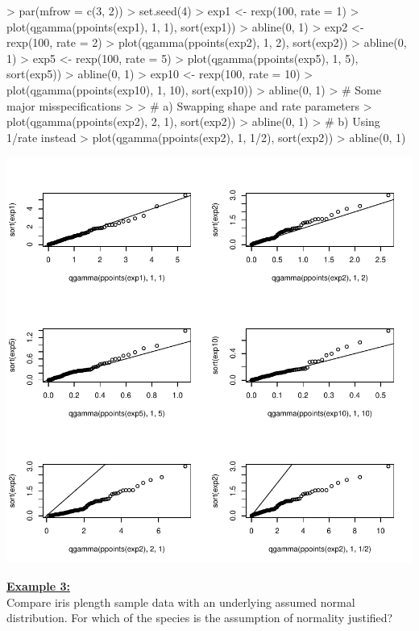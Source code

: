 \documentclass[12pt,letterpaper,final]{article}
\begin{document}
\begin{Schunk}
\begin{Sinput}
> par(mfrow = c(3, 2))
> set.seed(4) 
> exp1 <- rexp(100, rate = 1)
> plot(qgamma(ppoints(exp1), 1, 1), sort(exp1))
> abline(0, 1)
> exp2 <- rexp(100, rate = 2)
> plot(qgamma(ppoints(exp2), 1, 2), sort(exp2))
> abline(0, 1)
> exp5 <- rexp(100, rate = 5)
> plot(qgamma(ppoints(exp5), 1, 5), sort(exp5))
> abline(0, 1)
> exp10 <- rexp(100, rate = 10)
> plot(qgamma(ppoints(exp10), 1, 10), sort(exp10))
> abline(0, 1)
> # Some major misspecifications
> 
> # a) Swapping shape and rate parameters
> plot(qgamma(ppoints(exp2), 2, 1), sort(exp2))
> abline(0, 1)
> # b) Using 1/rate instead
> plot(qgamma(ppoints(exp2), 1, 1/2), sort(exp2))
> abline(0, 1)
\end{Sinput}
\end{Schunk}
\includegraphics{lect_main-033}


\underline{\bf Example 3:} \\
Compare iris plength sample data with an underlying assumed normal distribution.
For which of the species is the assumption of normality justified?
\end{document}
